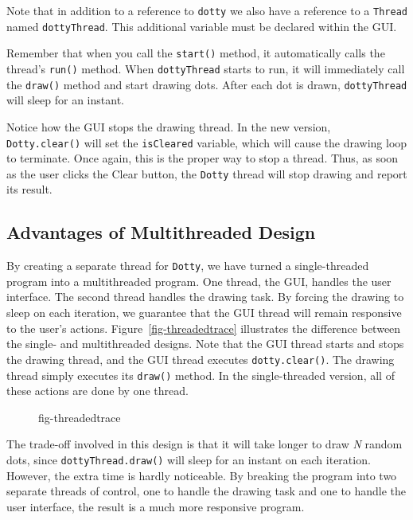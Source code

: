 \noindent Note that in addition to a reference to {\tt dotty}
we also have a reference to a {\tt Thread} named {\tt dottyThread}.
This additional variable must be declared within the GUI.

Remember that when you call the {\tt start()} method, it automatically
calls the thread's {\tt run()} method.   When {\tt dottyThread} starts
to run, it will immediately call the {\tt draw()} method and start
drawing dots.  After each dot is drawn, {\tt dottyThread} will sleep
for an instant.

Notice how the GUI stops the drawing thread.  In the new version, {\tt
Dotty.clear()} will set the {\tt isCleared} variable, which will cause
the drawing loop to terminate.  Once again, this is the proper way to
stop a thread.  Thus, as soon as the user clicks the Clear button, the
{\tt Dotty} thread will stop drawing and report its result.


\subsection{Advantages of Multithreaded Design}
\noindent By creating a separate thread for {\tt Dotty}, we have turned
a single-threaded program into a multithreaded program.   One thread,
the GUI, handles the user interface.  The second thread handles the
drawing task.  By forcing the drawing to sleep on each iteration, we
guarantee that the GUI thread will remain responsive to the user's
actions.  Figure~\ref{fig-threadedtrace} illustrates the difference
between the single- and multithreaded designs.  Note that the GUI
thread starts and stops the drawing thread, and the GUI thread
executes {\tt dotty.clear()}.  The drawing thread simply executes its
{\tt draw()} method.  In the single-threaded version, all of these
actions are done by one thread.

\begin{figure}[h!]
 {fig-threadedtrace}

\end{figure}

The trade-off involved in this design is that it will take
longer to draw {\it N} random dots, since {\tt dottyThread.draw()} will
sleep for an instant on each iteration.  However, the extra time is hardly
noticeable.  By breaking the program into two separate threads of
control, one to handle the drawing task and one to handle the user
interface, the result is a much more responsive program.

